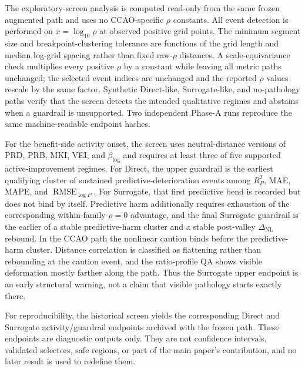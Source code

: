 \documentclass[10pt]{article}
\theoremstyle{definition}
\newcommand{\1}{\mathbf{1}}
\begin{document}
{
The exploratory-screen analysis is computed read-only from the same frozen augmented path and uses no CCAO-specific $\rho$ constants. All event detection is performed on $x=\log_{10}\rho$ at observed positive grid points. The minimum segment size and breakpoint-clustering tolerance are functions of the grid length and median log-grid spacing rather than fixed raw-$\rho$ distances. A scale-equivariance check multiplies every positive $\rho$ by a constant while leaving all metric paths unchanged; the selected event indices are unchanged and the reported $\rho$ values rescale by the same factor. Synthetic Direct-like, Surrogate-like, and no-pathology paths verify that the screen detects the intended qualitative regimes and abstains when a guardrail is unsupported. Two independent Phase-A runs reproduce the same machine-readable endpoint hashes.

For the benefit-side activity onset, the screen uses neutral-distance versions of PRD, PRB, MKI, VEI, and $\beta_{\log}$ and requires at least three of five supported active-improvement regimes. For Direct, the upper guardrail is the earliest qualifying cluster of sustained predictive-deterioration events among $R^2_P$, MAE, MAPE, and $\operatorname{RMSE}_{\log P}$. For Surrogate, that first predictive bend is recorded but does not bind by itself. Predictive harm additionally requires exhaustion of the corresponding within-family $\rho=0$ advantage, and the final Surrogate guardrail is the earlier of a stable predictive-harm cluster and a stable post-valley $\Delta_{\mathrm{NL}}$ rebound. In the CCAO path the nonlinear caution binds before the predictive-harm cluster. Distance correlation is classified as flattening rather than rebounding at the caution event, and the ratio-profile QA shows visible deformation mostly farther along the path. Thus the Surrogate upper endpoint is an early structural warning, not a claim that visible pathology starts exactly there.

For reproducibility, the historical screen yields the corresponding Direct and Surrogate activity/guardrail endpoints archived with the frozen path. These endpoints are diagnostic outputs only. They are not confidence intervals, validated selectors, safe regions, or part of the main paper's contribution, and no later result is used to redefine them.
}

\end{document}
